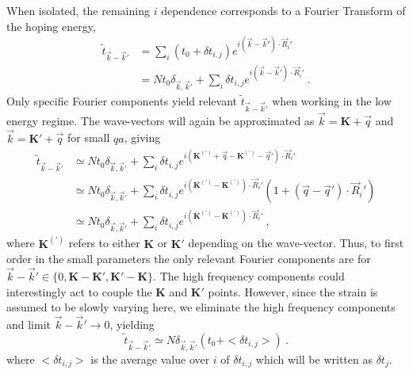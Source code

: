 When isolated, the remaining $i$ dependence corresponds to a Fourier Transform of the hoping energy,
\begin{align*}
  \tilde{t}_{\vec{k}-\vec{k}'}&=\sum_i \left( t_0+\delta t_{i,j} \right) e^{i(\vec{k}-\vec{k}')\cdot \vec{R}_i'} \\
                              &=N t_0 \delta_{\vec{k},\vec{k}'}+\sum_i \delta t_{i,j} e^{i(\vec{k}-\vec{k}')\cdot \vec{R}_i'} \ .
\end{align*}
Only specific Fourier components yield relevant $\tilde{t}_{\vec{k}-\vec{k}'}$ when working in the low energy regime.
The wave-vectors will again be approximated as $\vec{k}=\bm{K}+\vec{q}$ and $\vec{k}=\bm{K'}+\vec{q}$ for small $qa$, giving
\begin{align*}
  \tilde{t}_{\vec{k}-\vec{k}'}&\simeq N t_0 \delta_{\vec{k},\vec{k}'} + 
    \sum_i \delta t_{i,j} e^{i(\bm{K^{(')}}+\vec{q}-\bm{K^{(')}}-\vec{q}') \cdot \vec{R}_i'} \\
                              &\simeq N t_0 \delta_{\vec{k},\vec{k}'} + 
    \sum_i \delta t_{i,j} e^{i(\bm{K^{(')}}-\bm{K^{(')}}) \cdot \vec{R}_i'} (1+(\vec{q}-\vec{q}') \cdot \vec{R}_i') \\
                              &\simeq N t_0 \delta_{\vec{k},\vec{k}'} + 
    \sum_i \delta t_{i,j} e^{i(\bm{K^{(')}}-\bm{K^{(')}}) \cdot \vec{R}_i'} \ ,
\end{align*}
where $\bm{K^{(')}}$ refers to either $\bm{K}$ or $\bm{K'}$ depending on the wave-vector.
Thus, to first order in the small parameters the only relevant Fourier components are for $\vec{k}-\vec{k}' \in \{0,\bm{K}-\bm{K'}, \bm{K'}-\bm{K} \}$.
The high frequency components could interestingly act to couple the $\bm{K}$ and $\bm{K}'$ points.
However, since the strain is assumed to be slowly varying here, we eliminate the high frequency components and limit $\vec{k}-\vec{k}' \rightarrow 0$, yielding
\begin{equation*}
  \tilde{t}_{\vec{k}-\vec{k}'}\simeq N \delta_{\vec{k},\vec{k}'} (t_0 + <\delta t_{i,j}>) \ .
\end{equation*}
where $<\delta t_{i,j}>$ is the average value over $i$ of $\delta t_{i,j}$ which will be written as $\delta t_j$.


